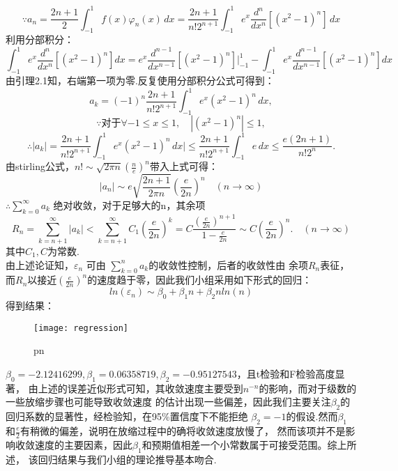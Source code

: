 \documentclass{article}
\begin{document}
    $$\because a_n=\frac{2n+1}{2}\int_{-1}^{1} f(x)\varphi_n(x)\,dx
    =\frac{2n+1}{n!2^{n+1}}\int_{-1}^{1} e^x \frac{d^n}{dx^n}[(x^2-1)^n]\,dx
    $$
    利用分部积分：
    $$\int_{-1}^{1} e^x \frac{d^n}{dx^n}[(x^2-1)^n]dx=
    e^x\frac{d^{n-1}}{dx^{n-1}}[(x^2-1)^n]|_{-1}^{1}-
    \int_{-1}^{1} e^x \frac{d^{n-1}}{dx^{n-1}}[(x^2-1)^n]dx
    $$
    由引理2.1知，右端第一项为零.反复使用分部积分公式可得到：
    $$a_k=(-1)^{n}\frac{2n+1}{n!2^{n+1}}\int_{-1}^{1} e^x(x^2-1)^n\,dx ,
    $$
    $$\because 对于\forall -1\leqslant x \leqslant 1,\quad |(x^2-1)^n|\leqslant 1,
    $$
    $$\therefore |a_k|=\frac{2n+1}{n!2^{n+1}}\int_{-1}^{1} e^x(x^2-1)^n\,dx|
    \leqslant \frac{2n+1}{n!2^{n+1}}\int_{-1}^{1}e\,dx \leqslant \frac{e(2n+1)}{n!2^n}.
    $$
    由stirling公式，$n!\sim \sqrt{2\pi n}(\frac{n}{e})^n $带入上式可得：
    $$|a_n|\sim e\sqrt{\frac{2n+1}{2\pi n}}(\frac{e}{2n})^n \quad (n\rightarrow \infty)
    $$
    $\therefore \sum_{k=0}^{\infty} a_k$ 绝对收敛，对于足够大的n，其余项
    $$R_n=\sum_{k=n+1}^{\infty} |a_k| < \sum_{k=n+1}^{\infty} C_1(\frac{e}{2n})^k
    =C\frac{(\frac{e}{2n})^{n+1}}{1-\frac{e}{2n}} \sim C(\frac{e}{2n})^n. \quad (n\rightarrow \infty)
    $$
    其中$C_1,C$为常数.\\
    由上述论证知，$\varepsilon_n$ 可由 $\sum_{k=0}^{n} a_k$的收敛性控制，后者的收敛性由
    余项$R_n$表征，而$R_n$以接近$(\frac{e}{2n})^n$的速度趋于零，因此我们小组采用如下形式的回归：
    $$ln(\varepsilon_n)\sim \beta_0 +\beta_1 n +\beta_2 nln(n)
    $$
    得到结果：
    \begin{figure}[H]
        \centering
        \texttt{[image: regression]}
        \caption{pn}
    \end{figure}
    $\beta_0=-2.12416299,\beta_1=0.06358719,\beta_2=-0.95127543 $，且t检验和F检验高度显著，
    由上述的误差近似形式可知，其收敛速度主要受到$n^{-n}$的影响，而对于级数的一些放缩步骤也可能导致收敛速度
    的估计出现一些偏差，因此我们主要关注$\beta_2$的回归系数的显著性，经检验知，在95\%置信度下不能拒绝
    $\beta_2=-1$的假设.然而$\beta_1$和$\frac{e}{2}$有稍微的偏差，说明在放缩过程中的确将收敛速度放慢了，
    然而该项并不是影响收敛速度的主要因素，因此$\beta_1$和预期值相差一个小常数属于可接受范围。综上所述，
    该回归结果与我们小组的理论推导基本吻合.\\
\end{document}
